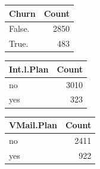 \documentclass{article}\usepackage[]{graphicx}\usepackage[]{color}
\newenvironment{knitrout}{}{} %
\begin{document}
\begin{knitrout}
\color{fgcolor}\begin{table}[!h]
\centering
\begin{tabular}[t]{l|r}
\hline
Churn & Count\\
\hline
False. & 2850\\
\hline
True. & 483\\
\hline
\end{tabular}
\end{table}

\begin{table}[!h]
\centering
\begin{tabular}[t]{l|r}
\hline
Int.l.Plan & Count\\
\hline
no & 3010\\
\hline
yes & 323\\
\hline
\end{tabular}
\end{table}

\begin{table}[!h]
\centering
\begin{tabular}[t]{l|r}
\hline
VMail.Plan & Count\\
\hline
no & 2411\\
\hline
yes & 922\\
\hline
\end{tabular}
\end{table}


\end{knitrout}
\end{document}
